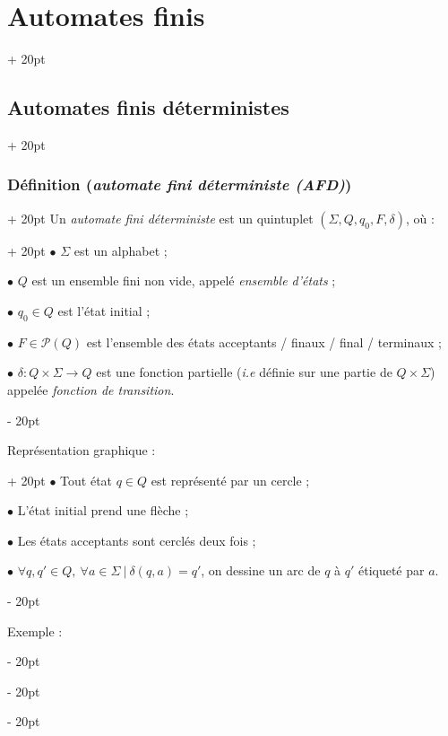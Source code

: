 \documentclass[a4paper, 12pt, twoside]{article}
\newcommand{\ind}[1][20pt]{\advance\leftskip + #1}
\newcommand{\deind}[1][20pt]{\advance\leftskip - #1}
\newenvironment{indt}[2][20pt]{#2 \par \ind[#1]}{\par \deind} %
\begin{document}
\begin{indt}{\section{Automates finis}}
\begin{indt}{\subsection{Automates finis déterministes}}
\begin{indt}{\subsubsection{Définition (\textit{automate fini déterministe (AFD)})}}
                \begin{indt}{Un \emph{automate fini déterministe} est un quintuplet $(\Sigma, Q, q_0, F, \delta)$, où :}
                    $\bullet$ $\Sigma$ est un alphabet ;

                    $\bullet$ $Q$ est un ensemble fini non vide, appelé \emph{ensemble d'états} ;

                    $\bullet$ $q_0 \in Q$ est l'état initial ;

                    $\bullet$ $F \in \mathcal P(Q)$ est l'ensemble des états acceptants / finaux / final / terminaux ;

                    $\bullet$ $\delta : Q \times \Sigma \longrightarrow Q$ est une fonction partielle (\textit{i.e} définie sur une partie de $Q \times \Sigma$) appelée \emph{fonction de transition}.
                \end{indt}

                \vspace{12pt}
                
                \begin{indt}{Représentation graphique :}
                    $\bullet$ Tout état $q \in Q$ est représenté par un cercle ;

                    $\bullet$ L'état initial prend une flèche ;

                    $\bullet$ Les états acceptants sont cerclés deux fois ;

                    $\bullet$ $\forall q, q' \in Q,\ \forall a \in \Sigma\ |\ \delta(q, a) = q'$, on dessine un arc de $q$ à $q'$ étiqueté par $a$.
                \end{indt}

                \vspace{12pt}
                
                Exemple :
                \begin{center}
\end{center}
\end{indt}
\end{indt}
\end{indt}
\end{document}
